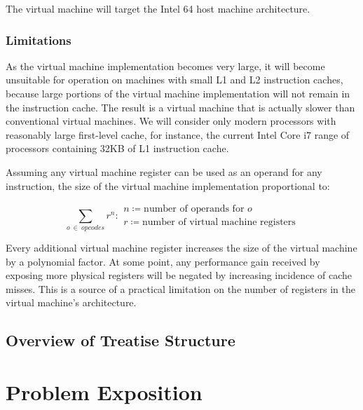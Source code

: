 		The virtual machine will target the Intel 64 host machine architecture.
		
		\subsection{Limitations}
			As the virtual machine implementation becomes very large, it will become unsuitable for operation on machines with small L1 and L2 instruction caches, because large portions of the virtual machine implementation will not remain in the instruction cache. The result is a virtual machine that is actually slower than conventional virtual machines. We will consider only modern processors with reasonably large first-level cache, for instance, the current Intel Core i7 range of processors containing 32KB of L1 instruction cache.
			
			Assuming any virtual machine register can be used as an operand for any instruction, the size of the virtual machine implementation proportional to:
			
			\[
				\sum_{o~\in~opcodes} r^n : 
					\begin{array}{l}
						n \coloneqq \text{number of operands for $o$} \\
						r \coloneqq \text{number of virtual machine registers}
					\end{array}
			\] 
			
			Every additional virtual machine register increases the size of the virtual machine by a polynomial factor. At some point, any performance gain received by exposing more physical registers will be negated by increasing incidence of cache misses. This is a source of a practical limitation on the number of registers in the virtual machine's architecture.
			
				
	\section{Overview of Treatise Structure}

\chapter{Problem Exposition}

